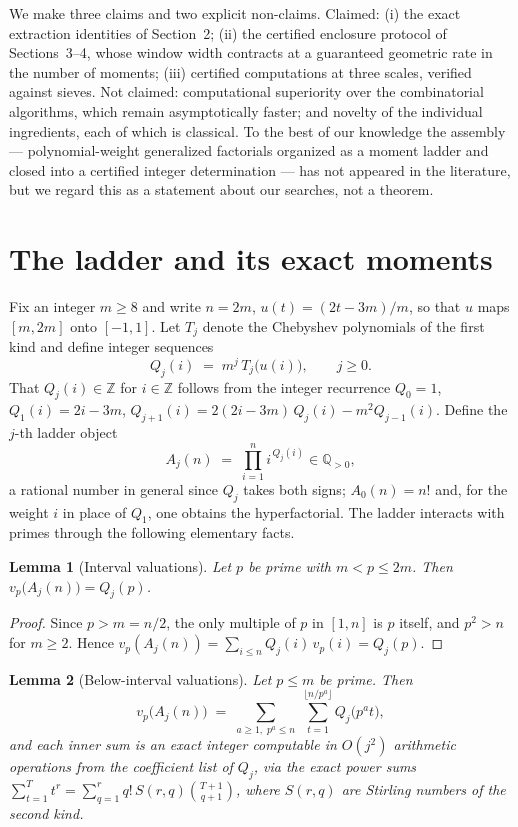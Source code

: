 \documentclass[11pt]{article}
\newtheorem{lemma}{Lemma}
\theoremstyle{remark}
\newcommand{\Z}{\mathbb{Z}}
\begin{document}
We make three claims and two explicit non-claims. Claimed: (i) the exact extraction identities of
Section~2; (ii) the certified enclosure protocol of Sections~3--4, whose window width contracts at a
guaranteed geometric rate in the number of moments; (iii) certified computations at three scales,
verified against sieves. Not claimed: computational superiority over the combinatorial algorithms, which
remain asymptotically faster; and novelty of the individual ingredients, each of which is classical. To
the best of our knowledge the assembly --- polynomial-weight generalized factorials organized as a moment
ladder and closed into a certified integer determination --- has not appeared in the literature, but we
regard this as a statement about our searches, not a theorem.

\section{The ladder and its exact moments}

Fix an integer $m \ge 8$ and write $n = 2m$, $u(t) = (2t - 3m)/m$, so that $u$ maps $[m, 2m]$ onto
$[-1, 1]$. Let $T_j$ denote the Chebyshev polynomials of the first kind and define integer sequences
\[
Q_j(i) \;=\; m^{j}\, T_j\big(u(i)\big), \qquad j \ge 0 .
\]
That $Q_j(i) \in \Z$ for $i \in \Z$ follows from the integer recurrence
$Q_0 = 1$, $Q_1(i) = 2i - 3m$, $Q_{j+1}(i) = 2(2i-3m)\,Q_j(i) - m^2 Q_{j-1}(i)$.
Define the $j$-th ladder object
\[
A_j(n) \;=\; \prod_{i=1}^{n} i^{\,Q_j(i)} \in \mathbb{Q}_{>0},
\]
a rational number in general since $Q_j$ takes both signs; $A_0(n) = n!$ and, for the weight $i$ in
place of $Q_1$, one obtains the hyperfactorial. The ladder interacts with primes through the following
elementary facts.

\begin{lemma}[Interval valuations]\label{lem:val}
Let $p$ be prime with $m < p \le 2m$. Then $v_p\big(A_j(n)\big) = Q_j(p)$.
\end{lemma}

\begin{proof}
Since $p > m = n/2$, the only multiple of $p$ in $[1, n]$ is $p$ itself, and $p^2 > n$ for $m \ge 2$.
Hence $v_p(A_j(n)) = \sum_{i \le n} Q_j(i)\, v_p(i) = Q_j(p)$.
\end{proof}

\begin{lemma}[Below-interval valuations]\label{lem:corr}
Let $p \le m$ be prime. Then
\[
v_p\big(A_j(n)\big) \;=\; \sum_{a \ge 1,\; p^a \le n} \;\sum_{t=1}^{\lfloor n/p^a \rfloor} Q_j\big(p^a t\big),
\]
and each inner sum is an exact integer computable in $O(j^2)$ arithmetic operations from the coefficient
list of $Q_j$, via the exact power sums
$\sum_{t=1}^{T} t^r = \sum_{q=1}^{r} q!\, S(r,q) \binom{T+1}{q+1}$,
where $S(r,q)$ are Stirling numbers of the second kind.
\end{lemma}
\end{document}
